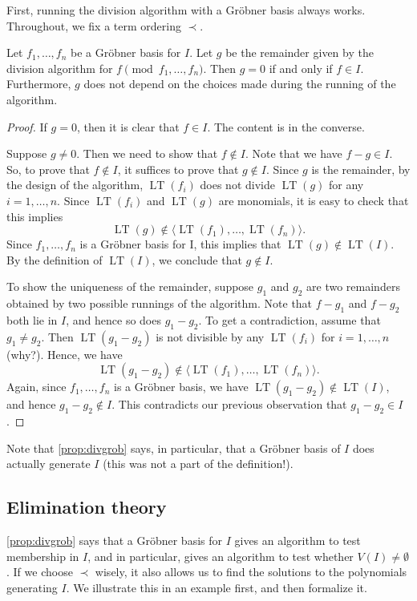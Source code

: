\documentclass[11pt]{article}
\DeclareMathOperator{\LT}{LT}
\begin{document}
First, running the division algorithm with a Gr\"obner basis always works.
Throughout, we fix a term ordering $\prec$.
\begin{proposition}\label{prop:divgrob}
  Let $f_1, \dots, f_n$ be a Gr\"obner basis for $I$.
  Let $g$ be the remainder given by the division algorithm for $f \pmod {f_1, \dots, f_n}$.
  Then $g = 0$ if and only if $f \in I$.
  Furthermore, $g$ does not depend on the choices made during the running of the algorithm.
\end{proposition}
\begin{proof}
  If $g = 0$, then it is clear that $f \in I$.
  The content is in the converse.

  Suppose $g \neq 0$.
  Then we need to show that $f \not \in I$.
  Note that we have $f-g \in I$.
  So, to prove that $f \not \in I$, it suffices to prove that $g \not \in I$.
  Since $g$ is the remainder, by the design of the algorithm, $\LT(f_i)$ does not divide $\LT(g)$ for any $i = 1,\dots, n$.
  Since $\LT(f_i)$ and $\LT(g)$ are monomials, it is easy to check that this implies
  \[ \LT(g) \not \in \langle  \LT(f_1), \dots, \LT(f_n) \rangle.\]
  Since $f_1, \dots, f_n$ is a Gr\"obner basis for I, this implies that $\LT(g) \not \in \LT(I)$.
  By the definition of $\LT(I)$, we conclude that $g \not \in I$.

  To show the uniqueness of the remainder, suppose $g_1$ and $g_2$ are two remainders obtained by two possible runnings of the algorithm.
  Note that $f-g_1$ and $f-g_2$ both lie in $I$, and hence so does $g_1-g_2$.
  To get a contradiction, assume that $g_1 \neq g_2$.
  Then $\LT(g_1 - g_2)$ is not divisible by any $\LT(f_i)$ for $i = 1,\dots,n$ (why?).
  Hence, we have
  \[\LT(g_1-g_2) \not \in \langle \LT(f_1), \dots, \LT(f_n) \rangle.\]
  Again, since $f_1, \dots, f_n$ is a Gr\"obner basis, we have $\LT(g_1-g_2) \not \in \LT(I)$, and hence $g_1 -g_2 \not \in I$.
  This contradicts our previous observation that $g_1-g_2 \in I$.
\end{proof}
Note that \autoref{prop:divgrob} says, in particular, that a Gr\"obner basis of $I$ does actually generate $I$ (this was not a part of the definition!).

\subsection{Elimination theory}
\autoref{prop:divgrob} says that a Gr\"obner basis for $I$ gives an algorithm to test membership in $I$, and in particular, gives an algorithm to test whether $V(I) \neq \emptyset$.
If we choose $\prec$ wisely, it also allows us to find the solutions to the polynomials generating $I$.
We illustrate this in an example first, and then formalize it.
\end{document}
